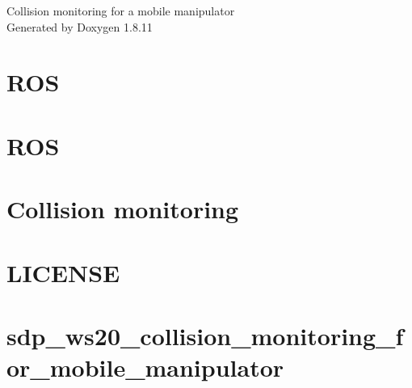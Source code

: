 \documentclass[twoside]{book}
\newcommand{\+}{\discretionary{\mbox{\scriptsize$\hookleftarrow$}}{}{}}
\newcommand{\clearemptydoublepage}{%
  \newpage{\pagestyle{empty}\cleardoublepage}%
}
\begin{document}
\hypersetup{pageanchor=false,
             bookmarksnumbered=true,
             pdfencoding=unicode
            }
\begin{titlepage}
\vspace*{7cm}
\begin{center}%
{\Large Collision monitoring for a mobile manipulator }\\
\vspace*{1cm}
{\large Generated by Doxygen 1.8.11}\\
\end{center}
\end{titlepage}
\clearemptydoublepage
\tableofcontents
\clearemptydoublepage
{}
\hypersetup{pageanchor=true}

\chapter{R\+OS}
\label{md_catkin_workspace_README}
\hypertarget{md_catkin_workspace_README}{}

\chapter{R\+OS}
\label{md_catkin_workspace_src_narko_kinova_base_collision_README}
\hypertarget{md_catkin_workspace_src_narko_kinova_base_collision_README}{}

\chapter{Collision monitoring}
\label{md__home_srini_hbrs_Fourthsem_SDP_ROS_setup_08032021_updated_1_sdp_ws20_collision_monitoring_for_mobile_manipulators_collision_monitoring_README}
\hypertarget{md__home_srini_hbrs_Fourthsem_SDP_ROS_setup_08032021_updated_1_sdp_ws20_collision_monitoring_for_mobile_manipulators_collision_monitoring_README}{}

\chapter{L\+I\+C\+E\+N\+SE}
\label{md_LICENSE}
\hypertarget{md_LICENSE}{}

\chapter{sdp\+\_\+ws20\+\_\+collision\+\_\+monitoring\+\_\+for\+\_\+mobile\+\_\+manipulator}
\label{md_README}
\hypertarget{md_README}{}

\end{document}
